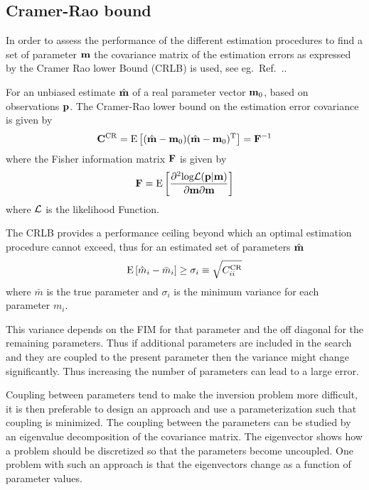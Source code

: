 \documentclass{saclantc}
\begin{document}
\subsection{Cramer-Rao bound}
In order to assess the performance of the different estimation
procedures to find a set of parameter $\bf m$ 
the covariance matrix of the estimation errors as expressed
by the Cramer Rao lower Bound (CRLB) is used, see eg.\ 
Ref.\ \cite{ottersten, baggeroer:asa89}..

For an unbiased estimate $\hat{\bf m}$ of a real parameter vector
${\bf m}_0$, based on observations ${\bf p}$. The Cramer-Rao lower bound
on the estimation error covariance is given by 
\begin{equation}
{\bf C}^{\rm CR}=
{\rm E} \left[ (\hat{\bf m}-{\bf m}_0)(\hat{\bf m}-{\bf m}_0)^{\rm T}  \right]
={\bf F}^{-1}
\end{equation}
where the Fisher information matrix ${\bf F}$ is given by
\[
{\bf F}= 
{\rm E}\left[ \frac{\partial^2 \mbox{log} {\cal L}( {\bf p} |{\bf m}) }
                   {\partial {\bf m} \partial {\bf m}} \right]
\]
where $\cal L$ is the likelihood Function.

The  CRLB provides a performance
ceiling beyond which an optimal estimation procedure cannot exceed,
thus for an estimated set of parameters $\hat{\bf m}$ 
\begin{equation}
{\rm E}\left[ {\hat{m}_i- \bar{m}_i} \right] \ge \sigma_i \equiv \sqrt{C_{ii}^{\rm CR}}
\end{equation}
where $\bar{m}$ is the true parameter and $ \sigma_i $ is the minimum 
variance for each parameter $m_i$.

This variance depends on the FIM for that parameter and the off
diagonal for the remaining parameters. Thus if additional parameters are
included in the search and they are coupled to the present parameter
 then the variance might
change significantly. 
Thus increasing the number of  parameters can lead to a large error.

Coupling between parameters tend to make the inversion problem more
difficult, it is then preferable to design an approach and use a
parameterization such that coupling is minimized.
The coupling between the parameters can be studied by an eigenvalue
decomposition of the covariance matrix.
The eigenvector shows how a problem should be discretized so that the
parameters become uncoupled. One problem with such an approach is
that the eigenvectors change as a function of parameter values.
\end{document}
